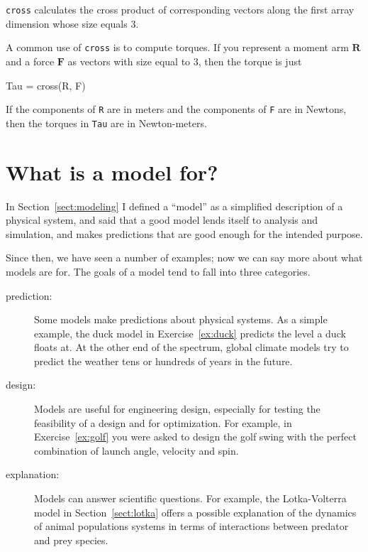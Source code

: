 \documentclass[
]{book}
\numberwithin{Answer}{chapter}
\numberwithin{Exercise}{chapter}
\renewcommand{\vec}[1]{\bm{\mathbf{#1}}}
\begin{document}
{\tt cross} calculates the cross product of corresponding vectors along
the first array dimension whose size equals 3.

A common use of {\tt cross} is to compute torques.  If you represent
a moment arm $\vec{R}$ and a force $\vec{F}$ as vectors with size equal
to 3, then the torque is just

\begin{code}
Tau = cross(R, F)
\end{code}

If the components of {\tt R} are in meters and the components
of {\tt F} are in Newtons, then the torques in {\tt Tau} are
in Newton-meters.




\section{What is a model for?}

In Section~\ref{sect:modeling} I defined a ``model'' as a simplified
description of a physical system, and said that a good model
lends itself to analysis and simulation, and makes predictions
that are good enough for the intended purpose.

Since then, we have seen a number of examples; now we can
say more about what models are for.  The goals of a model tend
to fall into three categories.

\begin{description}

\item[prediction:] Some models make predictions about physical
systems.  As a simple example, the duck model in
Exercise~\ref{ex:duck} predicts the level a duck floats at.  At the other
end of the spectrum, global climate models try to predict the weather
tens or hundreds of years in the future.

\item[design:] Models are useful for engineering design, especially
for testing the feasibility of a design and for optimization.  For
example, in Exercise~\ref{ex:golf} you were asked to design the golf
swing with the perfect combination of launch angle, velocity and spin.

\item[explanation:] Models can answer scientific questions.  For
example, the Lotka-Volterra model in Section~\ref{sect:lotka} offers a
possible explanation of the dynamics of animal populations systems in
terms of interactions between predator and prey species.

\end{description}
\end{document}
